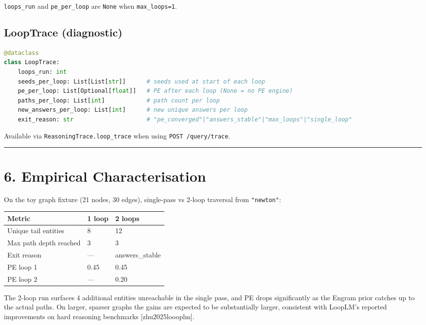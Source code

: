 \texttt{loops\_run} and \texttt{pe\_per\_loop} are \texttt{None} when \texttt{max\_loops=1}.

\subsection*{LoopTrace (diagnostic)}
\begin{lstlisting}[language=Python]
@dataclass
class LoopTrace:
    loops_run: int
    seeds_per_loop: List[List[str]]      # seeds used at start of each loop
    pe_per_loop: List[Optional[float]]   # PE after each loop (None = no PE engine)
    paths_per_loop: List[int]            # path count per loop
    new_answers_per_loop: List[int]      # new unique answers per loop
    exit_reason: str                     # "pe_converged"|"answers_stable"|"max_loops"|"single_loop"
\end{lstlisting}

Available via \texttt{ReasoningTrace.loop\_trace} when using \texttt{POST /query/trace}.

\medskip\noindent\rule{\linewidth}{0.4pt}\medskip

\section*{6. Empirical Characterisation}

On the toy graph fixture (21 nodes, 30 edges), single-pass vs 2-loop traversal from \texttt{"newton"}:

\begin{table}[h]
\small\centering
\begin{tabular}{lll}
\toprule
Metric & 1 loop & 2 loops \\
\midrule
Unique tail entities & 8 & 12 \\
Max path depth reached & 3 & 3 \\
Exit reason & --- & answers_stable \\
PE loop 1 & 0.45 & 0.45 \\
PE loop 2 & --- & 0.20 \\
\bottomrule
\end{tabular}
\end{table}


The 2-loop run surfaces 4 additional entities unreachable in the single pass, and PE drops significantly as the Engram prior catches up to the actual paths. On larger, sparser graphs the gains are expected to be substantially larger, consistent with LoopLM's reported improvements on hard reasoning benchmarks [zhu2025loooplm].

